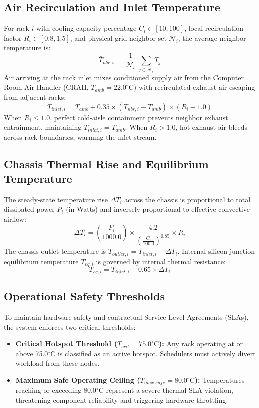 \documentclass[conference,10pt]{IEEEtran}
\begin{document}
\subsection{Air Recirculation and Inlet Temperature}
For rack $i$ with cooling capacity percentage $C_i \in [10, 100]$, local recirculation factor $R_i \in [0.8, 1.5]$, and physical grid neighbor set $\mathcal{N}_i$, the average neighbor temperature is:
\begin{equation}
\label{eq:tnbr}
\bar{T}_{nbr,i} = \frac{1}{|\mathcal{N}_i|} \sum_{j \in \mathcal{N}_i} T_j
\end{equation}
Air arriving at the rack inlet mixes conditioned supply air from the Computer Room Air Handler (CRAH, $T_{amb} = 22.0^\circ\text{C}$) with recirculated exhaust air escaping from adjacent racks:
\begin{equation}
\label{eq:tinlet}
T_{inlet,i} = T_{amb} + 0.35 \times (\bar{T}_{nbr,i} - T_{amb}) \times (R_i - 1.0)
\end{equation}
When $R_i \le 1.0$, perfect cold-aisle containment prevents neighbor exhaust entrainment, maintaining $T_{inlet,i} = T_{amb}$. When $R_i > 1.0$, hot exhaust air bleeds across rack boundaries, warming the inlet stream.

\subsection{Chassis Thermal Rise and Equilibrium Temperature}
The steady-state temperature rise $\Delta T_i$ across the chassis is proportional to total dissipated power $P_i$ (in Watts) and inversely proportional to effective convective airflow:
\begin{equation}
\label{eq:deltat}
\Delta T_i = \left(\frac{P_i}{1000.0}\right) \times \frac{4.2}{\left(\frac{C_i}{100.0}\right)^{0.85}} \times R_i
\end{equation}
The chassis outlet temperature is $T_{outlet,i} = T_{inlet,i} + \Delta T_i$. Internal silicon junction equilibrium temperature $T_{eq,i}$ is governed by internal thermal resistance:
\begin{equation}
\label{eq:teq}
T_{eq,i} = T_{inlet,i} + 0.65 \times \Delta T_i
\end{equation}

\subsection{Operational Safety Thresholds}
To maintain hardware safety and contractual Service Level Agreements (SLAs), the system enforces two critical thresholds:
\begin{itemize}
    \item \textbf{Critical Hotspot Threshold ($T_{crit} = 75.0^\circ\text{C}$):} Any rack operating at or above 75.0$^\circ$C is classified as an active hotspot. Schedulers must actively divert workload from these nodes.
    \item \textbf{Maximum Safe Operating Ceiling ($T_{max\_safe} = 80.0^\circ\text{C}$):} Temperatures reaching or exceeding 80.0$^\circ$C represent a severe thermal SLA violation, threatening component reliability and triggering hardware throttling.
\end{itemize}
\end{document}
